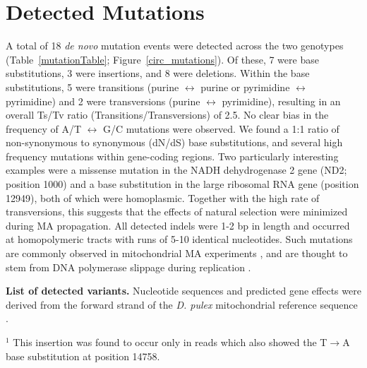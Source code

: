\documentclass[12pt,twoside]{reedthesis}
\begin{document}
\section{Detected Mutations}
A total of 18 \textit{de novo} mutation events were detected across the two genotypes (\mbox{Table \ref{mutationTable};} \mbox{Figure \ref{circ_mutations}}).
Of these, 7 were base substitutions, 3 were insertions, and 8 were deletions. 
Within the base substitutions, 5 were transitions (purine $\leftrightarrow$ purine or pyrimidine $\leftrightarrow$ pyrimidine) and 2 were transversions (purine $\leftrightarrow$ pyrimidine), resulting in an overall Ts/Tv ratio (Transitions/Transversions) of 2.5.
No clear bias in the frequency of A/T $\leftrightarrow$ G/C mutations were observed.
We found a 1:1 ratio of non-synonymous to synonymous (dN/dS) base substitutions, and several high frequency mutations within gene-coding regions.
Two particularly interesting examples were a missense mutation in the NADH dehydrogenase 2 gene (ND2; position 1000) and a base substitution in the large ribosomal RNA gene (position 12949), both of which were homoplasmic.
Together with the high rate of transversions, this suggests that the effects of natural selection were minimized during \gls{MA} propagation.
All detected \gls{indels} were 1-2 bp in length and occurred at homopolymeric tracts with runs of 5-10 identical nucleotides.
Such mutations are commonly observed in mitochondrial \gls{MA} experiments \citep{haag-liautard_direct_2008, seyfert_rate_2008, howe_high_2010, xu_high_2012}, and are thought to stem from DNA polymerase slippage during replication \citep{viguera_replication_2001}.

\begin{table}[h!]
    \begin{center}
        \caption[List of detected variants]{\textbf{List of detected variants.} Nucleotide sequences and predicted gene effects were derived from the forward strand of the \textit{D. pulex} mitochondrial reference sequence \citep{crease_complete_1999}.}

        \flushleft \scriptsize $^{1}$ This insertion was found to occur only in reads which also showed the T$\rightarrow$A base substitution at position 14758.
        \label{mutationTable}
    \end{center}
\end{table}
\end{document}
